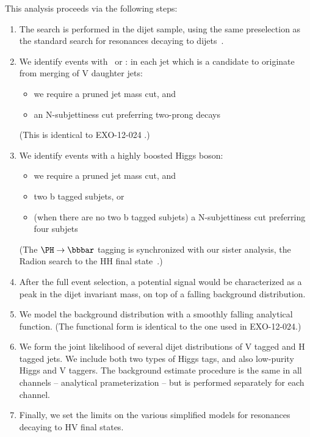 This analysis proceeds via the following steps:
\begin{enumerate}
\item The search is performed in the dijet sample, using the same
      preselection as the standard search for resonances decaying to 
      dijets~\cite{cmsdijet, cmsdijet8TeV}.

\item We identify events with \PW\ or \cPZ: in each jet which is a candidate
  to originate from merging of V daughter jets:  
  \begin{itemize}
  \item we require a pruned jet mass cut, and
  \item an N-subjettiness cut preferring two-prong decays
  \end{itemize}
  (This is identical to EXO-12-024 \cite{CMS:2013fea}.)

\item We identify events with a highly boosted Higgs boson:
  \begin{itemize}
  \item we require a pruned jet mass cut, and
  \item two b tagged subjets, or 
  \item (when there are no two b tagged subjets) a N-subjettiness cut
    preferring four subjets
  \end{itemize}
  (The $\Hbb$ tagging is synchronized with our sister analysis, the Radion
  search to the HH final state~\cite{HH4b}.)

\item After the full event selection, a potential signal would be
  characterized as a peak in the dijet invariant mass, on top of a
  falling background distribution.  

\item We model the background distribution with a smoothly falling 
  analytical function.  (The functional form is identical
  to the one used in EXO-12-024.)

\item We form the joint likelihood of several dijet distributions
  of V tagged and H tagged jets.  We include both two types of
  Higgs tags, and also low-purity Higgs and V taggers.  The background
  estimate procedure is the same in all channels -- analytical
  prameterization -- but is performed separately for each channel.

\item Finally, we set the limits on the various simplified models
  for resonances decaying to HV final states.

\end{enumerate}

